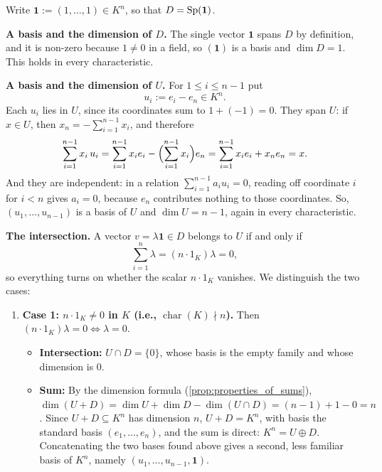 \begin{exercisesolution*}
\label{sol:hyperplane_and_diagonal_subspaces}
Write $\mathbf{1} := (1, \dots, 1) \in K^n$, so that $D = \operatorname{Sp}(\mathbf{1})$.

\textbf{A basis and the dimension of $D$.} The single vector $\mathbf{1}$ spans $D$ by definition, and it is non-zero because $1 \ne 0$ in a field, so $(\mathbf{1})$ is a basis and $\dim D = 1$. This holds in every characteristic.

\textbf{A basis and the dimension of $U$.} For $1 \le i \le n-1$ put
\[
    u_i := e_i - e_n \in K^n .
\]
Each $u_i$ lies in $U$, since its coordinates sum to $1 + (-1) = 0$. They span $U$: if $x \in U$, then $x_n = -\sum_{i=1}^{n-1} x_i$, and therefore
\[
    \sum_{i=1}^{n-1} x_i \, u_i = \sum_{i=1}^{n-1} x_i e_i - \Bigl( \sum_{i=1}^{n-1} x_i \Bigr) e_n = \sum_{i=1}^{n-1} x_i e_i + x_n e_n = x .
\]
And they are independent: in a relation $\sum_{i=1}^{n-1} a_i u_i = 0$, reading off coordinate $i$ for $i < n$ gives $a_i = 0$, because $e_n$ contributes nothing to those coordinates. So, $(u_1, \dots, u_{n-1})$ is a basis of $U$ and $\dim U = n-1$, again in every characteristic.

\textbf{The intersection.} A vector $v = \lambda \mathbf{1} \in D$ belongs to $U$ if and only if
\[
\sum_{i=1}^n \lambda = (n \cdot 1_K) \lambda = 0,
\]
so everything turns on whether the scalar $n \cdot 1_K$ vanishes. We distinguish the two cases:

\begin{enumerate}[label=\textbf{(\alph*)}]
    \item \textbf{Case 1: $n \cdot 1_K \ne 0$ in $K$ (i.e., $\operatorname{char}(K) \nmid n$).}
    Then $(n \cdot 1_K) \lambda = 0 \iff \lambda = 0$.
    \begin{itemize}
        \item \textbf{Intersection:} $U \cap D = \{0\}$, whose basis is the empty family and whose dimension is $0$.
        \item \textbf{Sum:} By the dimension formula (\cref{prop:properties_of_sums}), $\dim(U + D) = \dim U + \dim D - \dim(U \cap D) = (n - 1) + 1 - 0 = n$.
        Since $U + D \subseteq K^n$ has dimension $n$, $U + D = K^n$, with basis the standard basis $(e_1, \dots, e_n)$, and the sum is direct: $K^n = U \oplus D$. Concatenating the two bases found above gives a second, less familiar basis of $K^n$, namely $(u_1, \dots, u_{n-1}, \mathbf{1})$.
    \end{itemize}


\end{enumerate}
\end{exercisesolution*}
